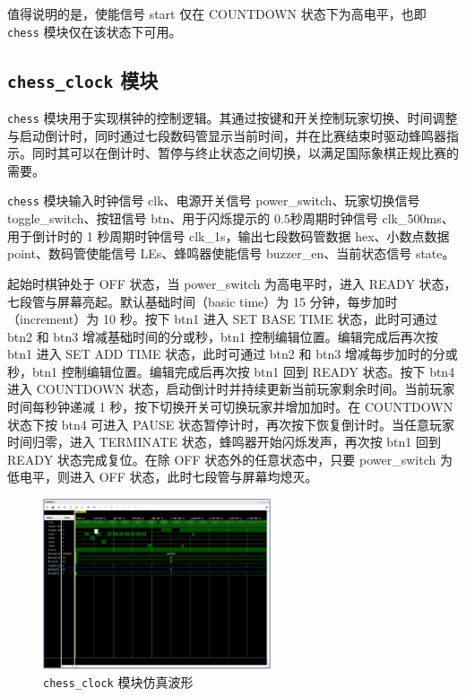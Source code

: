 \documentclass[a4paper, 12pt]{article}
\begin{document}
            值得说明的是，使能信号 start 仅在 COUNTDOWN 状态下为高电平，也即 \texttt{chess} 模块仅在该状态下可用。
        
        \subsection{\texttt{chess\_clock} 模块}

            \texttt{chess} 模块用于实现棋钟的控制逻辑。其通过按键和开关控制玩家切换、时间调整与启动倒计时，同时通过七段数码管显示当前时间，并在比赛结束时驱动蜂鸣器指示。同时其可以在倒计时、暂停与终止状态之间切换，以满足国际象棋正规比赛的需要。

            \texttt{chess} 模块输入时钟信号 clk、电源开关信号 power\_switch、玩家切换信号 toggle\_switch、按钮信号 btn、用于闪烁提示的 0.5秒周期时钟信号 clk\_500ms、用于倒计时的 1 秒周期时钟信号 clk\_1s，输出七段数码管数据 hex、小数点数据 point、数码管使能信号 LEs、蜂鸣器使能信号 buzzer\_en、当前状态信号 state。

            起始时棋钟处于 OFF 状态，当 power\_switch 为高电平时，进入 READY 状态，七段管与屏幕亮起。默认基础时间（basic time）为 15 分钟，每步加时（increment）为 10 秒。按下 btn1 进入 SET BASE TIME 状态，此时可通过 btn2 和 btn3 增减基础时间的分或秒，btn1 控制编辑位置。编辑完成后再次按 btn1 进入 SET ADD TIME 状态，此时可通过 btn2 和 btn3 增减每步加时的分或秒，btn1 控制编辑位置。编辑完成后再次按 btn1 回到 READY 状态。按下 btn4 进入 COUNTDOWN 状态，启动倒计时并持续更新当前玩家剩余时间。当前玩家时间每秒钟递减 1 秒，按下切换开关可切换玩家并增加加时。在 COUNTDOWN 状态下按 btn4 可进入 PAUSE 状态暂停计时，再次按下恢复倒计时。当任意玩家时间归零，进入 TERMINATE 状态，蜂鸣器开始闪烁发声，再次按 btn1 回到 READY 状态完成复位。在除 OFF 状态外的任意状态中，只要 power\_switch 为低电平，则进入 OFF 状态，此时七段管与屏幕均熄灭。

            \begin{figure}[H]
                \centering
                \includegraphics[width=0.6\textwidth]{wave1}
                \caption{\texttt{chess\_clock} 模块仿真波形}
            \end{figure}
\end{document}
